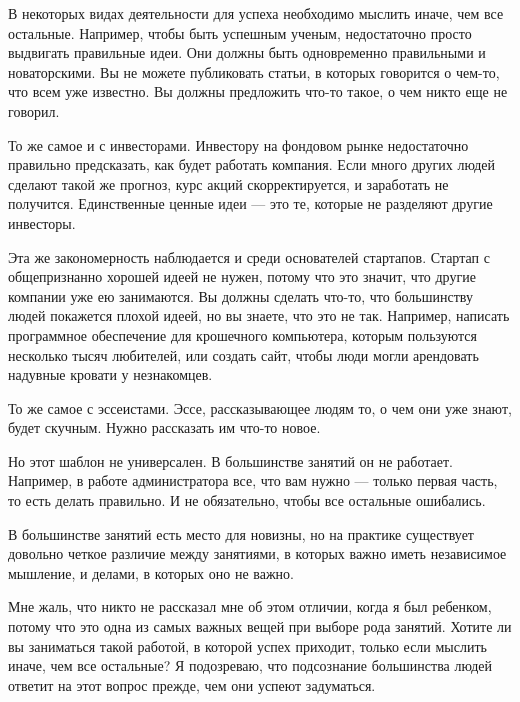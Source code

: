 \documentclass[ebook,12pt,oneside,openany]{memoir}
\begin{document}
\maketitle

В некоторых видах деятельности для успеха необходимо мыслить иначе,
чем все остальные. Например, чтобы быть успешным ученым, недостаточно
просто выдвигать правильные идеи. Они должны быть одновременно
правильными и новаторскими. Вы не можете публиковать статьи, в которых
говорится о чем-то, что всем уже известно. Вы должны предложить что-то
такое, о чем никто еще не говорил. \newline

То же самое и с инвесторами. Инвестору на фондовом рынке недостаточно
правильно предсказать, как будет работать компания. Если много других
людей сделают такой же прогноз, курс акций скорректируется, и
заработать не получится. Единственные ценные идеи — это те, которые не
разделяют другие инвесторы. \newline

Эта же закономерность наблюдается и среди основателей стартапов.
Стартап с общепризнанно хорошей идеей не нужен, потому что это значит,
что другие компании уже ею занимаются. Вы должны сделать что-то, что
большинству людей покажется плохой идеей, но вы знаете, что это не
так. Например, написать программное обеспечение для крошечного
компьютера, которым пользуются несколько тысяч любителей, или создать
сайт, чтобы люди могли арендовать надувные кровати у незнакомцев. \newline

То же самое с эссеистами. Эссе, рассказывающее людям то, о чем они уже
знают, будет скучным. Нужно рассказать им что-то новое. \newline

Но этот шаблон не универсален. В большинстве занятий он не работает.
Например, в работе администратора все, что вам нужно — только первая
часть, то есть делать правильно. И не обязательно, чтобы все остальные
ошибались. \newline

В большинстве занятий есть место для новизны, но на практике
существует довольно четкое различие между занятиями, в которых важно
иметь независимое мышление, и делами, в которых оно не важно. \newline

Мне жаль, что никто не рассказал мне об этом отличии, когда я был
ребенком, потому что это одна из самых важных вещей при выборе рода
занятий. Хотите ли вы заниматься такой работой, в которой успех
приходит, только если мыслить иначе, чем все остальные? Я подозреваю,
что подсознание большинства людей ответит на этот вопрос прежде, чем
они успеют задуматься. \newline
\end{document}
